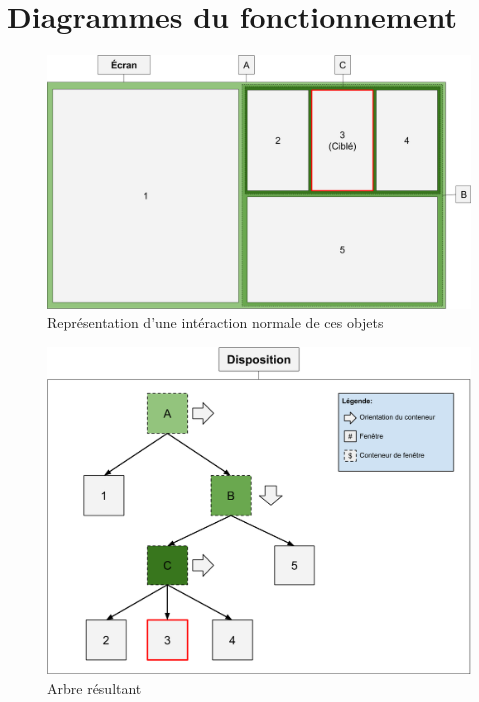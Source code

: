 \documentclass[titlepage]{article}
\begin{document}
	\section{Diagrammes du fonctionnement}
	\begin{figure}[h]
		\centering
		\includegraphics[width=\textwidth]{diagramme_du_fonctionnement.png}
		\caption {Représentation d'une intéraction normale de ces objets}
	\end{figure}
	\begin{figure}[h]
		\centering
		\includegraphics[width=\textwidth]{diagramme_du_fonctionnement_arbre.png}
		\caption {Arbre résultant}
	\end{figure}
\end{document}
